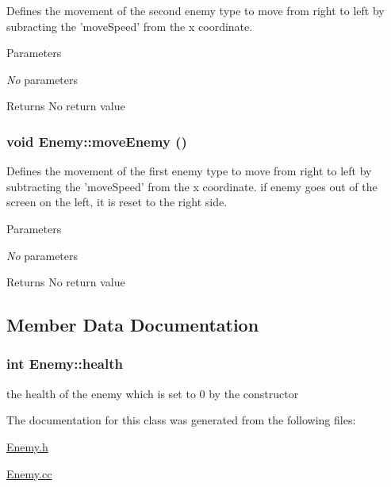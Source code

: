 Defines the movement of the second enemy type to move from right to left by subracting the 'moveSpeed' from the x coordinate. 
\begin{DoxyParams}{Parameters}
\item[{\em No}]parameters \end{DoxyParams}
\begin{DoxyReturn}{Returns}
No return value 
\end{DoxyReturn}
\hypertarget{classEnemy_a0dcca8a418323526c286c323a3fb2fd1}{
\subsubsection[{moveEnemy}]{\setlength{\rightskip}{0pt plus 5cm}void Enemy::moveEnemy ()}}
\label{classEnemy_a0dcca8a418323526c286c323a3fb2fd1}


Defines the movement of the first enemy type to move from right to left by subtracting the 'moveSpeed' from the x coordinate. if enemy goes out of the screen on the left, it is reset to the right side. 
\begin{DoxyParams}{Parameters}
\item[{\em No}]parameters \end{DoxyParams}
\begin{DoxyReturn}{Returns}
No return value 
\end{DoxyReturn}


\subsection{Member Data Documentation}
\hypertarget{classEnemy_aedd5e7bf8ef07ee97be433c853a10d8d}{
\subsubsection[{health}]{\setlength{\rightskip}{0pt plus 5cm}int {\bf Enemy::health}}}
\label{classEnemy_aedd5e7bf8ef07ee97be433c853a10d8d}
the health of the enemy which is set to 0 by the constructor 

The documentation for this class was generated from the following files:\begin{DoxyCompactItemize}
\item 
\hyperlink{Enemy_8h}{Enemy.h}\item 
\hyperlink{Enemy_8cc}{Enemy.cc}\end{DoxyCompactItemize}
